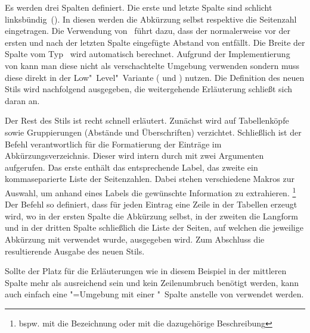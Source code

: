 \documentclass[%
  english,ngerman,%
  geometry=no,DIV=12,automark,%
]{tudscrartcl}
\begin{document}
Es werden drei Spalten definiert. Die erste und letzte Spalte sind schlicht 
linksbündig~(). In diesen werden die Abkürzung selbst respektive die 
Seitenzahl eingetragen. Die Verwendung von~ führt dazu, dass der 
normalerweise vor der ersten und nach der letzten Spalte eingefügte Abstand von 
 entfällt. Die Breite der Spalte vom Typ~ wird 
automatisch berechnet. Aufgrund der Implementierung von  
kann man diese nicht als verschachtelte Umgebung verwenden sondern muss diese 
direkt in der Low"~Level"~Variante ( und ) 
nutzen. Die Definition des neuen Stils  wird nachfolgend 
ausgegeben, die weitergehende Erläuterung schließt sich daran an.
%
\InputHook{\let\newglossarystyle\renewglossarystyle}
\begin{Hint}
\end{Hint}
%
Der Rest des Stils ist recht schnell erläutert. Zunächst wird auf Tabellenköpfe 
sowie Gruppierungen (Abstände und Überschriften) verzichtet. Schließlich ist 
der Befehl  verantwortlich für die Formatierung der Einträge 
im Abkürzungsverzeichnis. Dieser wird intern durch  mit 
zwei Argumenten aufgerufen. Das erste enthält das entsprechende Label, das 
zweite ein kommaseparierte Liste der Seitenzahlen. Dabei stehen verschiedene 
Makros zur Auswahl, um anhand eines Labels die gewünschte Information zu 
extrahieren.%
\footnote{%
  bspw. mit  die Bezeichnung oder mit 
   die dazugehörige Beschreibung%
}
Der Befehl  so definiert, dass für jeden Eintrag eine Zeile 
in der Tabellen erzeugt wird, wo in der ersten Spalte die Abkürzung selbst, in 
der zweiten die Langform und in der dritten Spalte schließlich die Liste der 
Seiten, auf welchen die jeweilige Abkürzung mit  
verwendet wurde, ausgegeben wird. Zum Abschluss die resultierende Ausgabe des 
neuen Stils.
%
\begin{Hint*}
\printacronyms[style=acrotabularx]
\end{Hint*}
\begin{quoting}[rightmargin=0pt]
\vspace*{-\baselineskip}
\InputExcerpt
\end{quoting}
%
Sollte der Platz für die Erläuterungen wie in diesem Beispiel in der mittleren 
Spalte mehr als ausreichend sein und kein Zeilenumbruch benötigt werden, kann 
auch einfach eine "=Umgebung mit einer "~Spalte 
anstelle von  verwendet werden.
\end{document}
